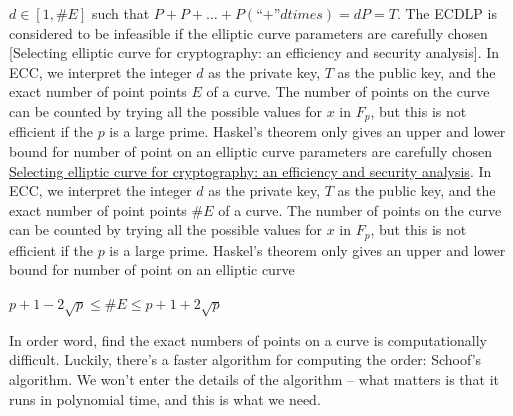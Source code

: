 $d \in [1, \#E]$ such that $P + P + … + P (“+” d times) = dP = T$.
The ECDLP is considered to be infeasible if the elliptic curve parameters are carefully chosen [Selecting elliptic curve for cryptography: an efficiency and security analysis]. In ECC, we interpret the integer $d$ as the private key, $T$ as the public key, and the exact number of point points $E$ of a curve. The number of points on the curve can be counted by trying all the possible values for $x$ in $F_p$, but this is not efficient if the $p$ is a large prime. Haskel’s theorem only gives an upper and lower bound for number of point on an elliptic curve parameters are carefully chosen \href{https://www.researchgate.net/publication/274653226_Selecting_Elliptic_Curves_for_Cryptography_An_Efficiency_and_Security_Analysis}{Selecting elliptic curve for cryptography: an efficiency and security analysis}. In ECC, we interpret the integer $d$ as the private key, $T$ as the public key, and the exact number of point points $\#E$ of a curve. The number of points on the curve can be counted by trying all the possible values for $x$ in $F_p$, but this is not efficient if the $p$ is a large prime. Haskel’s theorem only gives an upper and lower bound for number of point on an elliptic curve\\
\hspace{0.5cm}
\begin{center}
$p+1-2\sqrt{p} \leq \#E \leq p+1+2\sqrt{p}$\\
\end{center}
\hspace{0.5cm}

In order word, find the exact numbers of points on a curve is computationally difficult. Luckily, there's a faster algorithm for computing the order: Schoof's algorithm. We won't enter the details of the algorithm – what matters is that it runs in polynomial time, and this is what we need.\\

